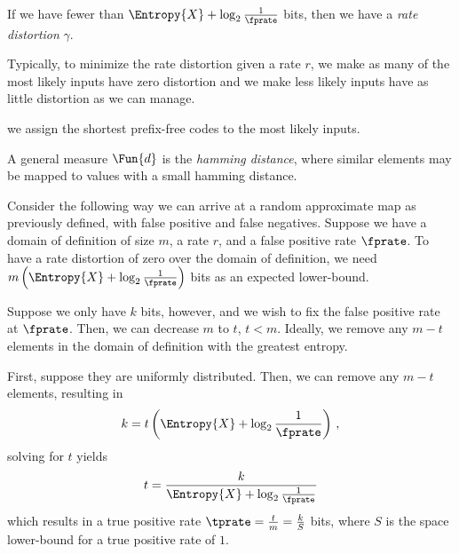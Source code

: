 If we have fewer than $\Entropy{X} + \log_2 \frac{1}{\fprate}$ bits, then we have a \emph{rate distortion} $\gamma$.

Typically, to minimize the rate distortion given a rate $r$, we make as many of the most likely inputs have zero distortion and we make less likely inputs have as little distortion as we can manage.

we assign the shortest prefix-free codes to the most likely inputs.


A general measure $\Fun{d}$ is the \emph{hamming distance}, where similar elements may be mapped to values with a small hamming distance.




Consider the following way we can arrive at a random approximate map as previously defined, with false positive and false negatives.
Suppose we have a domain of definition of size $m$, a rate $r$, and a false positive rate $\fprate$.
To have a rate distortion of zero over the domain of definition, we need $m \left( \Entropy{X} + \log_2 \frac{1}{\fprate}\right)$ bits as an expected lower-bound.

Suppose we only have $k$ bits, however, and we wish to fix the false positive rate at $\fprate$.
Then, we can decrease $m$ to $t$, $t < m$.
Ideally, we remove any $m-t$ elements in the domain of definition with the greatest entropy.

First, suppose they are uniformly distributed.
Then, we can remove any $m-t$ elements, resulting in
\begin{equation}
k = t \left( \Entropy{X} + \log_2 \frac{1}{\fprate}\right)\,,
\end{equation}
solving for $t$ yields
\begin{equation}
t = \frac{k}{\Entropy{X} + \log_2 \frac{1}{\fprate}}
\end{equation}
which results in a true positive rate $\tprate = \frac{t}{m} = \frac{k}{S}$ bits, where $S$ is the space lower-bound for a true positive rate of $1$.
